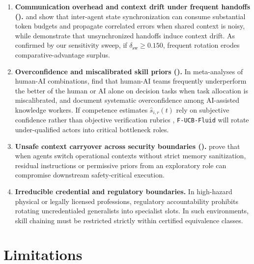 \documentclass[11pt]{article}
\begin{document}
\begin{enumerate}
  \item \textbf{Communication overhead and context drift under frequent handoffs (\citet{zhang2025agentprune, rodrigues2026drift, bertalanic2026consensus}).} \citet{zhang2025agentprune} and \citet{bertalanic2026consensus} show that inter-agent state synchronization can consume substantial token budgets and propagate correlated errors when shared context is noisy, while \citet{rodrigues2026drift} demonstrate that unsynchronized handoffs induce context drift. As confirmed by our sensitivity sweep, if $\delta_{\mathrm{sw}} \ge 0.150$, frequent rotation erodes comparative-advantage surplus.
  \item \textbf{Overconfidence and miscalibrated skill priors (\citet{eleftheriou2026confidence, vaccaro2024combinations}).} In meta-analyses of human-AI combinations, \citet{vaccaro2024combinations} find that human-AI teams frequently underperform the better of the human or AI alone on decision tasks when task allocation is miscalibrated, and \citet{eleftheriou2026confidence} document systematic overconfidence among AI-assisted knowledge workers. If competence estimates $\hat{s}_{i,r}(t)$ rely on subjective confidence rather than objective verification rubrics \citep{rlvr2_2026}, \texttt{F-UCB-Fluid} will rotate under-qualified actors into critical bottleneck roles.
  \item \textbf{Unsafe context carryover across security boundaries (\citet{das2026safecontext}).} \citet{das2026safecontext} prove that when agents switch operational contexts without strict memory sanitization, residual instructions or permissive priors from an exploratory role can compromise downstream safety-critical execution.
  \item \textbf{Irreducible credential and regulatory boundaries.} In high-hazard physical or legally licensed professions, regulatory accountability prohibits rotating uncredentialed generalists into specialist slots. In such environments, skill chaining \citep{hopp2004chaining} must be restricted strictly within certified equivalence classes.
\end{enumerate}

\section{Limitations}\label{sec:limits}
\end{document}
